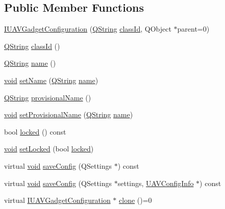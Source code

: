 \subsection*{Public Member Functions}
\begin{DoxyCompactItemize}
\item 
\hyperlink{group___core_plugin_gacdfdf0b1e39b5002472b76b6564ce51f}{I\-U\-A\-V\-Gadget\-Configuration} (\hyperlink{group___u_a_v_objects_plugin_gab9d252f49c333c94a72f97ce3105a32d}{Q\-String} \hyperlink{group___core_plugin_gac953657221ba7fda967ada0408332641}{class\-Id}, Q\-Object $\ast$parent=0)
\item 
\hyperlink{group___u_a_v_objects_plugin_gab9d252f49c333c94a72f97ce3105a32d}{Q\-String} \hyperlink{group___core_plugin_gac953657221ba7fda967ada0408332641}{class\-Id} ()
\item 
\hyperlink{group___u_a_v_objects_plugin_gab9d252f49c333c94a72f97ce3105a32d}{Q\-String} \hyperlink{group___core_plugin_ga644f51fd4e29830095d2e70735fa78e9}{name} ()
\item 
\hyperlink{group___u_a_v_objects_plugin_ga444cf2ff3f0ecbe028adce838d373f5c}{void} \hyperlink{group___core_plugin_ga8e4586ac1d5e24939892e82329c31088}{set\-Name} (\hyperlink{group___u_a_v_objects_plugin_gab9d252f49c333c94a72f97ce3105a32d}{Q\-String} \hyperlink{glext_8h_ad977737dfc9a274a62741b9500c49a32}{name})
\item 
\hyperlink{group___u_a_v_objects_plugin_gab9d252f49c333c94a72f97ce3105a32d}{Q\-String} \hyperlink{group___core_plugin_gae9603b84d30a99df5d2f21ad4f578488}{provisional\-Name} ()
\item 
\hyperlink{group___u_a_v_objects_plugin_ga444cf2ff3f0ecbe028adce838d373f5c}{void} \hyperlink{group___core_plugin_gadb0e3941af5a10dd466f1de72e39d9b3}{set\-Provisional\-Name} (\hyperlink{group___u_a_v_objects_plugin_gab9d252f49c333c94a72f97ce3105a32d}{Q\-String} \hyperlink{glext_8h_ad977737dfc9a274a62741b9500c49a32}{name})
\item 
bool \hyperlink{group___core_plugin_ga3e1a13f5823a638abfeedbde21a72027}{locked} () const 
\item 
\hyperlink{group___u_a_v_objects_plugin_ga444cf2ff3f0ecbe028adce838d373f5c}{void} \hyperlink{group___core_plugin_gae177a35baac59cd8d80598db6103bb70}{set\-Locked} (bool \hyperlink{group___core_plugin_ga3e1a13f5823a638abfeedbde21a72027}{locked})
\item 
virtual \hyperlink{group___u_a_v_objects_plugin_ga444cf2ff3f0ecbe028adce838d373f5c}{void} \hyperlink{group___core_plugin_gadd755520091c21c0ce09973c5bbdb7a9}{save\-Config} (Q\-Settings $\ast$) const 
\item 
virtual \hyperlink{group___u_a_v_objects_plugin_ga444cf2ff3f0ecbe028adce838d373f5c}{void} \hyperlink{group___core_plugin_gaabed0a41d7c153bb0b7e03486125bb42}{save\-Config} (Q\-Settings $\ast$settings, \hyperlink{class_core_1_1_u_a_v_config_info}{U\-A\-V\-Config\-Info} $\ast$) const 
\item 
virtual \hyperlink{class_core_1_1_i_u_a_v_gadget_configuration}{I\-U\-A\-V\-Gadget\-Configuration} $\ast$ \hyperlink{group___core_plugin_ga35f72dc89919925fd591fa509ebbf7dc}{clone} ()=0
\end{DoxyCompactItemize}


